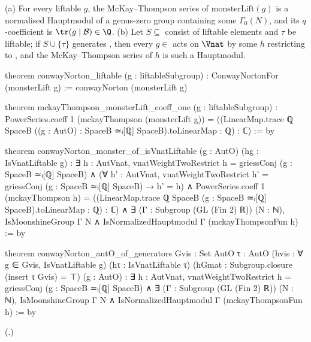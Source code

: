 \begin{theorem}\label{ch21:thm:cnLiftable}
(a) For every liftable $g$, the McKay--Thompson series of $\mathrm{monsterLift}(g)$ is a normalised
Hauptmodul of a genus-zero group containing some $\Gamma_0(N)$, and its $q$-coefficient is
$\tr(g\mid\chXXIB)\in\Q$.
(b) Let $S\subseteq$  consist of liftable elements and $\tau$ be liftable; if $S\cup\{\tau\}$
generates , then every $g\in$  acts on $\Vnat$ by some $h$ restricting to
, and the McKay--Thompson series of $h$ is such a Hauptmodul.
\end{theorem}
\begin{leancode}
theorem conwayNorton_liftable (g : liftableSubgroup) : ConwayNortonFor (monsterLift g) :=
  conwayNorton (monsterLift g)
\end{leancode}
\begin{leancode}
theorem mckayThompson_monsterLift_coeff_one (g : liftableSubgroup) :
    PowerSeries.coeff 1 (mckayThompson (monsterLift g))
      = ((LinearMap.trace ℚ SpaceB ((g : AutO) : SpaceB ≃ₗ[ℚ] SpaceB).toLinearMap : ℚ) : ℂ) := by
\end{leancode}
\begin{leancode}
theorem conwayNorton_monster_of_isVnatLiftable (g : AutO) (hg : IsVnatLiftable g) :
    ∃ h : AutVnat, vnatWeightTwoRestrict h = griessConj (g : SpaceB ≃ₗ[ℚ] SpaceB) ∧
      (∀ h' : AutVnat, vnatWeightTwoRestrict h' = griessConj (g : SpaceB ≃ₗ[ℚ] SpaceB) → h' = h) ∧
      PowerSeries.coeff 1 (mckayThompson h)
        = ((LinearMap.trace ℚ SpaceB (g : SpaceB ≃ₗ[ℚ] SpaceB).toLinearMap : ℚ) : ℂ) ∧
      ∃ (Γ : Subgroup (GL (Fin 2) ℝ)) (N : ℕ), IsMoonshineGroup Γ N ∧
        IsNormalizedHauptmodul Γ (mckayThompsonFun h) := by
\end{leancode}
\begin{leancode}
theorem conwayNorton_autO_of_generators {Gvis : Set AutO} {τ : AutO}
    (hvis : ∀ g ∈ Gvis, IsVnatLiftable g) (hτ : IsVnatLiftable τ)
    (hGmat : Subgroup.closure (insert τ Gvis) = ⊤) (g : AutO) :
    ∃ h : AutVnat, vnatWeightTwoRestrict h = griessConj (g : SpaceB ≃ₗ[ℚ] SpaceB) ∧
      ∃ (Γ : Subgroup (GL (Fin 2) ℝ)) (N : ℕ), IsMoonshineGroup Γ N ∧
        IsNormalizedHauptmodul Γ (mckayThompsonFun h) := by
\end{leancode}
(.)
